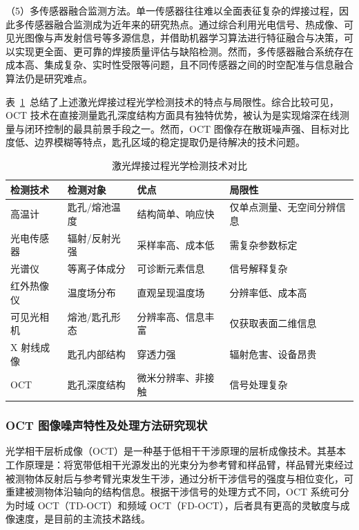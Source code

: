 （5）多传感器融合监测方法。单一传感器往往难以全面表征复杂的焊接过程，因此多传感器融合监测成为近年来的研究热点。通过综合利用光电信号、热成像、可见光图像与声发射信号等多源信息，并借助机器学习算法进行特征融合与决策，可以实现更全面、更可靠的焊接质量评估与缺陷检测。然而，多传感器融合系统存在成本高、集成复杂、实时性受限等问题，且不同传感器之间的时空配准与信息融合算法仍是研究难点。

表~\ref{tab:detection-comparison}~总结了上述激光焊接过程光学检测技术的特点与局限性。综合比较可见，OCT 技术在直接测量匙孔深度结构方面具有独特优势，被认为是实现熔深在线测量与闭环控制的最具前景手段之一。然而，OCT 图像存在散斑噪声强、目标对比度低、边界模糊等特点，匙孔区域的稳定提取仍是待解决的技术问题。

\begin{table}[htbp]
\centering
\renewcommand\arraystretch{1.5}
\caption{激光焊接过程光学检测技术对比}
\label{tab:detection-comparison}
\begin{tabular}{>{\centering\arraybackslash}p{2.2cm}>{\centering\arraybackslash}p{2.6cm}>{\centering\arraybackslash}p{3.4cm}>{\centering\arraybackslash}p{3.6cm}}
\toprule
检测技术 & 检测对象 & 优点 & 局限性 \\
\midrule
高温计 & 匙孔/熔池温度 & 结构简单、响应快 & 仅单点测量、无空间分辨信息 \\
光电传感器 & 辐射/反射光强 & 采样率高、成本低 & 需复杂参数标定 \\
光谱仪 & 等离子体成分 & 可诊断元素信息 & 信号解释复杂 \\
红外热像仪 & 温度场分布 & 直观呈现温度场 & 分辨率低、成本高 \\
可见光相机 & 熔池/匙孔形态 & 分辨率高、信息丰富 & 仅获取表面二维信息 \\
X 射线成像 & 匙孔内部结构 & 穿透力强 & 辐射危害、设备昂贵 \\
OCT & 匙孔深度结构 & 微米分辨率、非接触 & 信号处理复杂 \\
\bottomrule
\end{tabular}
\end{table}

\subsubsection{OCT 图像噪声特性及处理方法研究现状}
光学相干层析成像（OCT）是一种基于低相干干涉原理的层析成像技术。其基本工作原理是：将宽带低相干光源发出的光束分为参考臂和样品臂，样品臂光束经过被测物体反射后与参考臂光束发生干涉，通过分析干涉信号的强度与相位变化，可重建被测物体沿轴向的结构信息。根据干涉信号的处理方式不同，OCT 系统可分为时域 OCT（TD-OCT）和频域 OCT（FD-OCT），后者具有更高的灵敏度与成像速度，是目前的主流技术路线。

